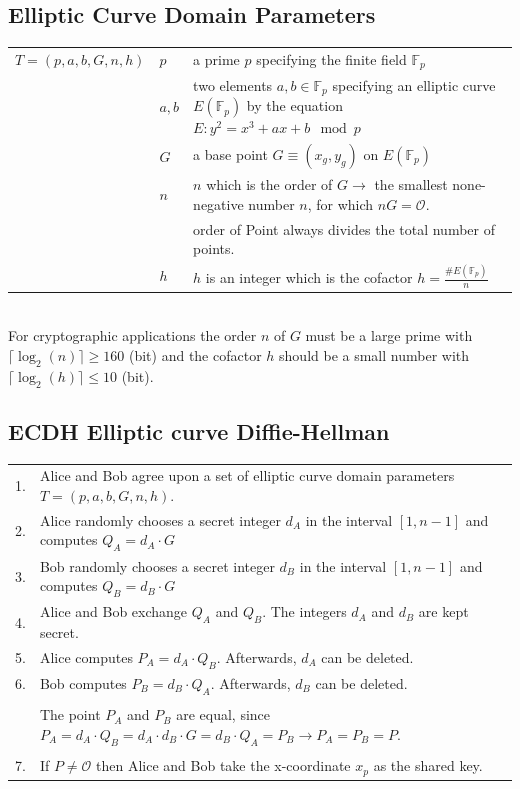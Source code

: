 \subsection{Elliptic Curve Domain Parameters}
\begin{tabular}{l l p{11cm}}
	$T=(p,a,b,G,n,h)$	&	$p$		&	a prime $p$ specifying the finite field $\mathbb{F}_p$ \\
						&	$a,b$	&	two elements $a,b \in \mathbb{F}_p$ specifying an elliptic curve $E(\mathbb{F}_p)$ by the equation
										$E: y^2=x^3+ax+b \mod p$ \\
						&	$G$		&	a base point $G \equiv (x_g, y_g)$ on $E(\mathbb{F}_p)$\\
						&	$n$		&	$n$ which is the order of $G \to$ the smallest none-negative number $n$, for which $nG=\mathcal{O}$.\\
						&			&	order of Point always divides the total number of points.\\
						&	$h$		& 	$h$ is an integer which is the cofactor $h=\frac{ \#E(\mathbb{F}_p) }{n}$ \\
\end{tabular}\\

For cryptographic applications the order $n$ of $G$ must be a large prime with $\lceil \log_2(n) \rceil \geq 160$ (bit) and the cofactor $h$
should be a small number with $\lceil \log_2(h) \rceil \leq 10$ (bit).

\subsection{ECDH Elliptic curve Diffie-Hellman}

\begin{tabular}{l p{14cm}}
	1.	&	Alice and Bob agree upon a set of elliptic curve domain parameters $T=(p,a,b,G,n,h)$. \\
	2.	&	Alice randomly chooses a secret integer $d_A$ in the interval $[1,n-1]$ and computes $Q_A=d_A \cdot G$\\
	3.	&	Bob randomly chooses a secret integer $d_B$ in the interval $[1,n-1]$ and computes $Q_B=d_B \cdot G$\\
	4.	&	Alice and Bob exchange $Q_A$ and $Q_B$. The integers $d_A$ and $d_B$ are kept secret.\\
	5.	&	Alice computes $P_A=d_A \cdot Q_B$. Afterwards, $d_A$ can be deleted. \\
	6.	&	Bob computes $P_B=d_B \cdot Q_A$. Afterwards, $d_B$ can be deleted. \\
		&	\\
		&	The point $P_A$ and $P_B$ are equal, since $P_A=d_A \cdot Q_B = d_A \cdot d_B \cdot G = d_B \cdot Q_A = P_B \to P_A = P_B = P$.\\
		&	\\
	7.	&	If $P \neq \mathcal{O}$ then Alice and Bob take the x-coordinate $x_p$ as the shared key.
\end{tabular}

